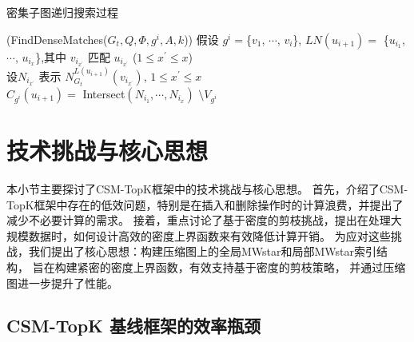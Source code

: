 \begin{algorithm}[h!]
	\small
	\caption{密集子图递归搜索过程}
	\label{alg:find-dense-matches}
	\iFunc(FindDenseMatches{(}$G_t, Q, \Phi, g^i, A, k${)})
	{
		假设 $g^{i}=$\{$v_{1}$, $\cdots$, $v_{i}$\}, $LN(u_{i+1})=$ \{$u_{i_1}$, $\cdots$, $u_{i_x}$\},其中 $v_{i_{x^\prime}}$ 匹配 $u_{i_{x^\prime}}$ ($1\leq x^\prime\leq x$)  \label{code:base-extension:begin} \\
		设$N_{i_{x^\prime}}$ 表示 $N_{G_t}^{L(u_{i+1})}(v_{i_{x^\prime}})$, $1\leq x^\prime\leq x$  \label{code:base-intersect:start} \\
		$C_{g^i}(u_{i+1})= $ Intersect$(N_{i_1}, \cdots, N_{i_x})$ $\setminus V_{g^i}$  \label{code:intersect}  \label{code:base-intersect:end}\\
		\Return 
	}
\end{algorithm}	

\section{技术挑战与核心思想}
本小节主要探讨了CSM-TopK框架中的技术挑战与核心思想。
首先，介绍了CSM-TopK框架中存在的低效问题，特别是在插入和删除操作时的计算浪费，并提出了减少不必要计算的需求。
接着，重点讨论了基于密度的剪枝挑战，提出在处理大规模数据时，如何设计高效的密度上界函数来有效降低计算开销。
为应对这些挑战，我们提出了核心思想：构建压缩图上的全局MWstar和局部MWstar索引结构，  旨在构建紧密的密度上界函数，有效支持基于密度的剪枝策略，
并通过压缩图进一步提升了性能。
\subsection{CSM-TopK 基线框架的效率瓶颈}

